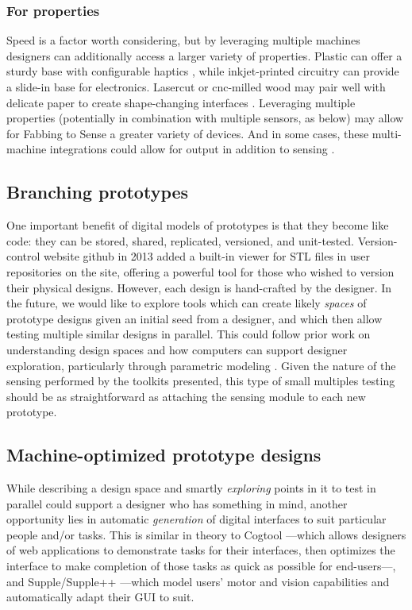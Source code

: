     \subsubsection{For properties}

    Speed is a factor worth considering, but by leveraging multiple machines designers can additionally access a larger variety of properties. Plastic can offer a sturdy base with configurable haptics \cite{torres-hapticprint}, while inkjet-printed circuitry can provide a slide-in base for electronics. Lasercut or cnc-milled wood may pair well with delicate paper to create shape-changing interfaces \cite{yao-pneui}. Leveraging multiple properties (potentially in combination with multiple sensors, as below) may allow for Fabbing to Sense a greater variety of devices. And in some cases, these multi-machine integrations could allow for output in addition to sensing \cite{yao-pneui}.

\subsection{Branching prototypes}

One important benefit of digital models of prototypes is that they become like code: they can be stored, shared, replicated, versioned, and unit-tested. Version-control website github \cite{github} in 2013 added a built-in viewer for STL files in user repositories on the site, offering a powerful tool for those who wished to version their physical designs. However, each design is hand-crafted by the designer. In the future, we would like to explore tools which can create likely \emph{spaces} of prototype designs given an initial seed from a designer, and which then allow testing multiple similar designs in parallel. This could follow prior work on understanding design spaces and how computers can support designer exploration, particularly through parametric modeling \cite{woodbury-designspace, woodbury-parametric}. Given the nature of the sensing performed by the toolkits presented, this type of small multiples testing should be as straightforward as attaching the sensing module to each new prototype.

\subsection{Machine-optimized prototype designs}

While describing a design space and smartly \emph{exploring} points in it to test in parallel could support a designer who has something in mind, another opportunity lies in automatic \emph{generation} of digital interfaces to suit particular people and/or tasks. This is similar in theory to Cogtool \cite{john-cogtool}---which allows designers of web applications to demonstrate tasks for their interfaces, then optimizes the interface to make completion of those tasks as quick as possible for end-users---, and Supple/Supple++ \cite{gajos-supple,gajos-supplepp}---which model users' motor and vision capabilities and automatically adapt their GUI to suit.

